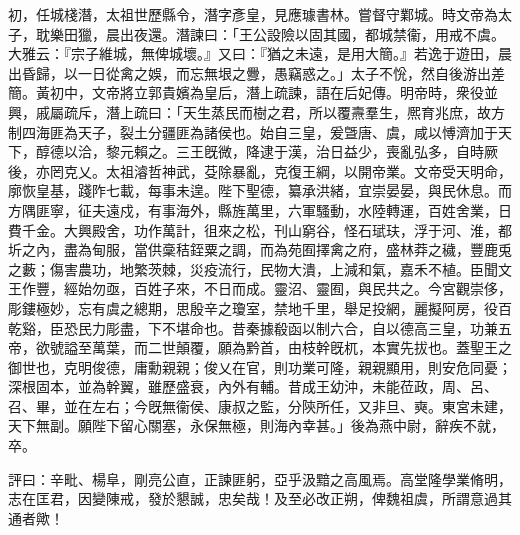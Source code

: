 \begin{pinyinscope}
初，任城棧潛，太祖世歷縣令，潛字彥皇，見應璩書林。嘗督守鄴城。時文帝為太子，耽樂田獵，晨出夜還。潛諫曰：「王公設險以固其國，都城禁衞，用戒不虞。大雅云：『宗子維城，無俾城壞。』又曰：『猶之未遠，是用大簡。』若逸于遊田，晨出昏歸，以一日從禽之娛，而忘無垠之釁，愚竊惑之。」太子不恱，然自後游出差簡。黃初中，文帝將立郭貴嬪為皇后，潛上疏諫，語在后妃傳。明帝時，衆役並興，戚屬疏斥，潛上疏曰：「天生蒸民而樹之君，所以覆燾羣生，熈育兆庶，故方制四海匪為天子，裂土分疆匪為諸侯也。始自三皇，爰曁唐、虞，咸以愽濟加于天下，醇德以洽，黎元賴之。三王旣微，降逮于漢，治日益少，喪亂弘多，自時厥後，亦罔克乂。太祖濬哲神武，芟除暴亂，克復王綱，以開帝業。文帝受天明命，廓恢皇基，踐阼七載，每事未遑。陛下聖德，纂承洪緒，宜崇晏晏，與民休息。而方隅匪寧，征夫遠戍，有事海外，縣旌萬里，六軍騷動，水陸轉運，百姓舍業，日費千金。大興殿舍，功作萬計，徂來之松，刊山窮谷，怪石珷玞，浮于河、淮，都圻之內，盡為甸服，當供稾秸銍粟之調，而為苑囿擇禽之府，盛林莽之穢，豐鹿兎之藪；傷害農功，地繁茨棘，災疫流行，民物大潰，上減和氣，嘉禾不植。臣聞文王作豐，經始勿亟，百姓子來，不日而成。靈沼、靈囿，與民共之。今宮觀崇侈，彫鏤極妙，忘有虞之總期，思殷辛之瓊室，禁地千里，舉足投網，麗擬阿房，役百乾谿，臣恐民力彫盡，下不堪命也。昔秦據殽函以制六合，自以德高三皇，功兼五帝，欲號謚至萬葉，而二世顛覆，願為黔首，由枝幹旣杌，本實先拔也。蓋聖王之御世也，克明俊德，庸勳親親；俊乂在官，則功業可隆，親親顯用，則安危同憂；深根固本，並為幹翼，雖歷盛衰，內外有輔。昔成王幼沖，未能莅政，周、呂、召、畢，並在左右；今旣無衞侯、康叔之監，分陝所任，又非旦、奭。東宮未建，天下無副。願陛下留心關塞，永保無極，則海內幸甚。」後為燕中尉，辭疾不就，卒。

評曰：辛毗、楊阜，剛亮公直，正諫匪躬，亞乎汲黯之高風焉。高堂隆學業脩明，志在匡君，因變陳戒，發於懇誠，忠矣哉！及至必改正朔，俾魏祖虞，所謂意過其通者歟！


\end{pinyinscope}